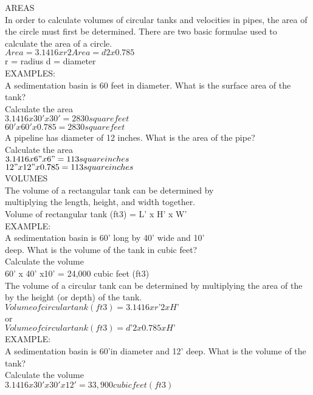 \documentclass{article}
\begin{document}
AREAS\\
In order to calculate volumes of circular tanks and velocities in pipes, the area of the circle must first be determined. There are two basic formulae used to calculate the area of a circle.\\
$Area = 3.1416 x r2 Area = d2 x 0.785$\\
r = radius d = diameter\\
EXAMPLES:\\
A sedimentation basin is 60 feet in diameter. What is the surface area of the tank?\\
Calculate the area\\
$3.1416 x 30' x 30' = 2830 square feet$\\
$60' x 60' x 0.785 = 2830 square feet$\\
A pipeline has diameter of 12 inches. What is the area of the pipe?\\
Calculate the area\\
$3.1416 x 6" x 6" = 113 square inches$\\
$12" x 12" x 0.785 = 113 square inches$\\
VOLUMES\\
The volume of a rectangular tank can be determined by\\
multiplying the length, height, and width together.\\
Volume of rectangular tank (ft3) = L’ x H’ x W’\\
EXAMPLE:\\
A sedimentation basin is 60' long by 40' wide and 10'\\
deep. What is the volume of the tank in cubic feet?\\
Calculate the volume\\
60' x 40' x10' = 24,000 cubic feet (ft3)\\
The volume of a circular tank can be determined by multiplying the area of the by the height (or depth) of the tank. \\
$Volume of circular tank (ft3) = 3.1416 x r’2 x H’$\\
or\\
$Volume of circular tank (ft3) = d’2 x 0.785 x H’$\\
EXAMPLE:\\
A sedimentation basin is 60’in diameter and 12' deep. What is the volume of the tank?\\
Calculate the volume\\
$3.1416 x 30' x 30' x 12' = 33,900 cubic feet (ft3)$\\
\end{document}
